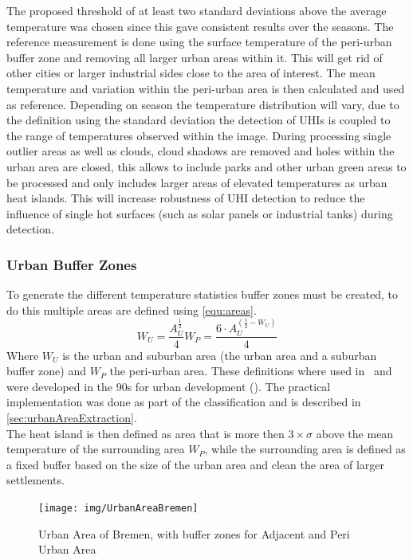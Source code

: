 \documentclass[12pt,a4paper, english]{article}
\begin{document}
    The proposed threshold of at least two standard deviations above the average temperature was chosen since this gave consistent results over the seasons. %
    The reference measurement is done using the surface temperature of the peri-urban buffer zone and removing all larger urban areas within it. 
    This will get rid of other cities or larger industrial sides close to the area of interest.
    The mean temperature and variation within the peri-urban area is then calculated and used as reference.
    Depending on season the temperature distribution will vary, due to the definition using the standard deviation the detection of \glspl{UHI} is coupled to the range of temperatures observed within the image. 
    During processing single outlier areas as well as clouds, cloud shadows are removed and holes within the urban area are closed, this allows to include parks and other urban green areas to be processed and only includes larger areas of elevated temperatures as urban heat islands. 
    This will increase robustness of \gls{UHI} detection to reduce the influence of single hot surfaces (such as solar panels or industrial tanks) during detection.

    \subsubsection{Urban Buffer Zones}\label{sec:urbanBufferzone}
      To generate the different temperature statistics buffer zones must be created, to do this multiple areas are defined using \cref{equ:areas}.
%
      \begin{equation}\label{equ:areas}
	      W_U = \frac{A_U^{\frac{1}{2}}}{4}
	      W_P = \frac{6\cdot A_U^{(\frac{1}{2}-W_U)}}{4}
      \end{equation}
      Where $W_U$ is the urban and suburban area (the urban area and a suburban buffer zone) and $W_P$ the peri-urban area.
      These definitions where used in~\cite{Sobrino2020} and were developed in the 90s for urban development (\cite{AlkanBala2014}).
      The practical implementation was done as part of the classification and is described in \cref{sec:urbanAreaExtraction}. \\
      The heat island is then defined as area that is more then $3\times \sigma$ above the mean temperature of the surrounding area $W_P$, while the surrounding area is defined as a fixed buffer based on the size of the urban area and clean the area of larger settlements. 
      \begin{figure}
        \texttt{[image: img/UrbanAreaBremen]}
        \caption{Urban Area of Bremen, with buffer zones for Adjacent and Peri Urban Area\label{fig:bufferedBremen}}
      \end{figure}
%
\end{document}
